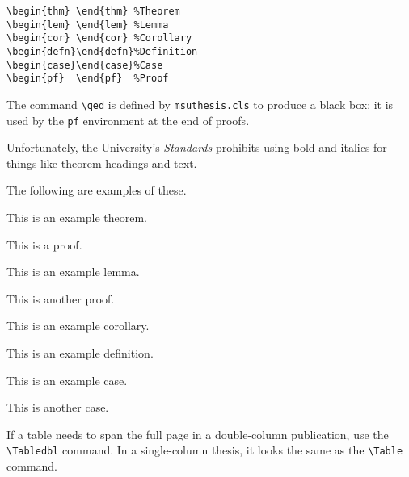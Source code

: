 \newspacing{\singlespacing}\begin{verbatim}
\begin{thm} \end{thm} %Theorem
\begin{lem} \end{lem} %Lemma
\begin{cor} \end{cor} %Corollary
\begin{defn}\end{defn}%Definition
\begin{case}\end{case}%Case
\begin{pf}  \end{pf}  %Proof
\end{verbatim}

The command \verb+\qed+ is defined by {\tt msuthesis.cls}
to produce a black box;
it is used by the \verb+pf+ environment at the end of proofs.

Unfortunately, the University's {\em Standards} prohibits using bold and italics for things like theorem headings and text.


The following are examples of these.

\begin{thm}
This is an example theorem.  
\end{thm}
\begin{pf}
This is a proof.
\end{pf}

\begin{lem}
This is an example lemma.
\end{lem}
\begin{pf}
This is another proof.
\end{pf}

\begin{cor}
This is an example corollary.
\end{cor}

\begin{defn}
This is an example definition.
\end{defn}

\begin{case}
This is an example case.
\end{case}

\begin{case}
This is another case.
\end{case}

%
%
{\sloppy 
If a table needs to span the full page 
in a double-column publication,
use the \verb+\Tabledbl+ command. In a single-column thesis,
it looks the same as the \verb+\Table+ command.

} %

